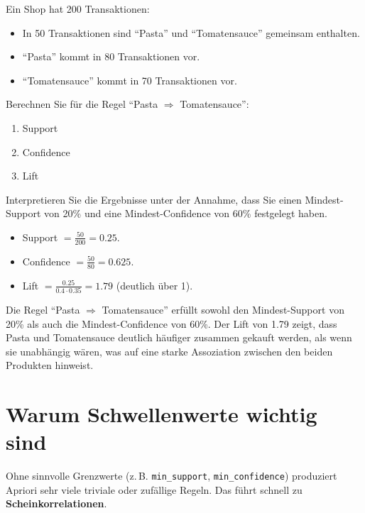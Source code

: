 \begin{myexercise}
    Ein Shop hat 200 Transaktionen:
    \begin{itemize}
        \item In 50 Transaktionen sind \enquote{Pasta} und \enquote{Tomatensauce} gemeinsam enthalten.
        \item \enquote{Pasta} kommt in 80 Transaktionen vor.
        \item \enquote{Tomatensauce} kommt in 70 Transaktionen vor.
    \end{itemize}
    Berechnen Sie für die Regel
    \enquote{Pasta $\Rightarrow$ Tomatensauce}:
    \begin{enumerate}
        \item Support
        \item Confidence
        \item Lift
    \end{enumerate}

    Interpretieren Sie die Ergebnisse unter der Annahme, dass Sie einen Mindest-Support von 20\% und eine Mindest-Confidence von 60\% festgelegt haben.
    \begin{myanswer}
        \begin{itemize}
            \item Support $= \frac{50}{200}=0.25$. \\
            \item Confidence $= \frac{50}{80}=0.625$. \\
            \item Lift $= \frac{0.25}{0.4\cdot0.35}=1.79$ (deutlich über 1).
        \end{itemize}
        Die Regel \enquote{Pasta $\Rightarrow$ Tomatensauce} erfüllt sowohl den Mindest-Support von 20\% als auch die Mindest-Confidence von 60\%. Der Lift von 1.79 zeigt, dass Pasta und Tomatensauce deutlich häufiger zusammen gekauft werden, als wenn sie unabhängig wären, was auf eine starke Assoziation zwischen den beiden Produkten hinweist.
    \end{myanswer}
\end{myexercise}

\section{Warum Schwellenwerte wichtig sind}

\begin{mycaution}
    Ohne sinnvolle Grenzwerte (z.\,B. \texttt{min\_support}, \texttt{min\_confidence})
    produziert Apriori sehr viele triviale oder zufällige Regeln.
    Das führt schnell zu \textbf{Scheinkorrelationen}.
\end{mycaution}

